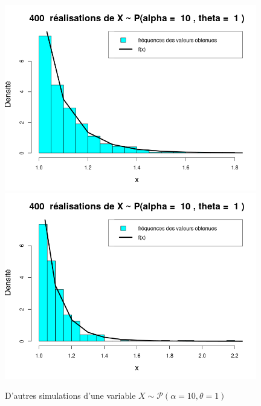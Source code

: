 \documentclass{article}
\begin{document}
\begin{figure}[!ht]
\begin{center}
\includegraphics[width=11cm]{plot_hist_1_a10}
\includegraphics[width=11cm]{plot_hist_2_a10}
\caption{D'autres simulations d'une variable $X \sim \mathcal{P}(\alpha=10,\theta=1)$}
\end{center}
\end{figure}

\clearpage
\end{document}
